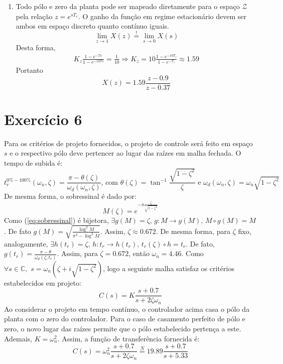 \documentclass{article}
\begin{document}
\begin{enumerate}
\item %
Todo pólo e zero da planta pode ser mapeado diretamente para o espaço $\mathcal{Z}$ pela relação $z = e^{s T_s}$. O ganho da função em regime estacionário devem ser ambos em espaço discreto quanto contínuo iguais.
\begin{equation}
\lim\limits_{z \rightarrow 1} X(z) \stackrel{!}{=} \lim\limits_{s \rightarrow 0} X(s) 
\end{equation} 
Desta forma,
\begin{equation*}
\begin{split}
K_z \frac{1 - e^{-Ts}}{1 - e^{-10Ts}} = \frac{1}{10} \Rightarrow K_z = 10 \frac{1 - e^{-10T_s}}{1 - e^{-T_s}} \approx 1.59
\end{split}
\end{equation*}
Portanto
\begin{equation}
X(z) = 1.59 \frac{z - 0.9}{z - 0.37}
\end{equation}
\end{enumerate}
\section*{Exercício 6}
Para os critérios de projeto fornecidos, o projeto de controle será feito em espaço $s$ e o respectivo pólo deve pertencer ao lugar das raízes em malha fechada. O tempo de subida é:
\begin{equation}
\label{eq:sobressinal}
t^{0\% - 100\%}_{r}(\omega_n, \zeta) = \frac{\pi - \theta(\zeta)}{\omega_d(\omega_n, \zeta)} \mbox{, com } \theta(\zeta) = \tan^{-1}\frac{\sqrt{1 - \zeta^2}}{\zeta} \mbox{ e } \omega_d(\omega_n, \zeta) = \omega_n \sqrt{1-\zeta^2}
\end{equation}
De mesma forma, o sobressinal é dado por:
\begin{equation}
\label{eq:sobressinal}
M(\zeta) = e^{-\pi \frac{\zeta}{\sqrt{1-\zeta^2}}}
\end{equation}
Como (\ref{eq:sobressinal}) é bijetora, $\exists g(M) = \zeta \mbox{, } g: M \rightarrow g(M) \mbox{, } M \circ g (M) = M$. De fato $g(M) = \sqrt{\frac{\log^2{M}}{\pi^2 - \log^2{M}}}$. Assim, $\zeta \approx 0.672$. De mesma forma, para $\zeta$ fixo, analogamente, $\exists h(t_r) = \zeta\mbox{, }h: t_r \rightarrow h(t_r)\mbox{, } t_r(\zeta) \circ h = t_r$. De fato, $g(t_r) = \frac{\pi - \theta}{\omega_d(\zeta, t_r)}$. Assim, para $\zeta = 0.672$, então $\omega_n = 4.46$.
Como $\forall s \in \mathbb{C}, \,\, s = \omega_n (\zeta + i \sqrt{1 - \zeta^2})$, logo a seguinte malha satisfaz os critérios estabelecidos em projeto:
\begin{equation}
C(s) = K \frac{s + 0.7}{s + 2 \zeta \omega_n}
\end{equation}
Ao considerar o projeto em tempo contínuo, o controlador acima casa o pólo da planta com o zero do controlador. Para o caso de casamento perfeito de pólo e zero, o novo lugar das raízes permite que o pólo estabelecido pertença a este. Ademais, $K = \omega_n^2$. Assim, a função de transferência fornecida é:
\begin{equation}
C(s) = \omega_n^2 \frac{s + 0.7}{s + 2 \zeta \omega_n} \stackrel{N}{=} 19.89 \frac{s + 0.7}{s + 5.33}
\end{equation}
\end{document}

